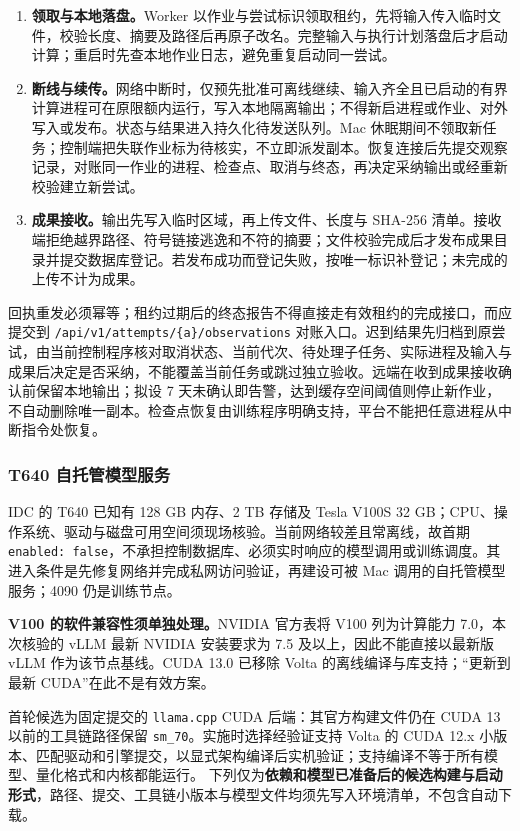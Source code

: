 \documentclass[11pt,a4paper]{article}
\begin{document}
\begin{enumerate}[leftmargin=2em,itemsep=3pt]
  \item \textbf{领取与本地落盘。}Worker 以作业与尝试标识领取租约，先将输入传入临时文件，校验长度、摘要及路径后再原子改名。完整输入与执行计划落盘后才启动计算；重启时先查本地作业日志，避免重复启动同一尝试。
  \item \textbf{断线与续传。}网络中断时，仅预先批准可离线继续、输入齐全且已启动的有界计算进程可在原限额内运行，写入本地隔离输出；不得新启进程或作业、对外写入或发布。状态与结果进入持久化待发送队列。Mac 休眠期间不领取新任务；控制端把失联作业标为待核实，不立即派发副本。恢复连接后先提交观察记录，对账同一作业的进程、检查点、取消与终态，再决定采纳输出或经重新校验建立新尝试。
  \item \textbf{成果接收。}输出先写入临时区域，再上传文件、长度与 SHA-256 清单。接收端拒绝越界路径、符号链接逃逸和不符的摘要；文件校验完成后才发布成果目录并提交数据库登记。若发布成功而登记失败，按唯一标识补登记；未完成的上传不计为成果。
\end{enumerate}

回执重发必须幂等；租约过期后的终态报告不得直接走有效租约的完成接口，而应提交到 \texttt{/api/v1/attempts/\{a\}/observations} 对账入口。迟到结果先归档到原尝试，由当前控制程序核对取消状态、当前代次、待处理子任务、实际进程及输入与成果后决定是否采纳，不能覆盖当前任务或跳过独立验收。远端在收到成果接收确认前保留本地输出；拟设 7 天未确认即告警，达到缓存空间阈值则停止新作业，不自动删除唯一副本。检查点恢复由训练程序明确支持，平台不能把任意进程从中断指令处恢复。

\subsubsection{T640 自托管模型服务}

IDC 的 T640 已知有 128 GB 内存、2 TB 存储及 Tesla V100S 32 GB；CPU、操作系统、驱动与磁盘可用空间须现场核验。当前网络较差且常离线，故首期 \texttt{enabled: false}，不承担控制数据库、必须实时响应的模型调用或训练调度。其进入条件是先修复网络并完成私网访问验证，再建设可被 Mac 调用的自托管模型服务；4090 仍是训练节点。

\textbf{V100 的软件兼容性须单独处理。}NVIDIA 官方表将 V100 列为计算能力 7.0，本次核验的 vLLM 最新 NVIDIA 安装要求为 7.5 及以上，因此不能直接以最新版 vLLM 作为该节点基线。CUDA 13.0 已移除 Volta 的离线编译与库支持；“更新到最新 CUDA”在此不是有效方案。\cite{ops-nvidia-legacy,ops-vllm-gpu,ops-cuda13}

首轮候选为固定提交的 \texttt{llama.cpp} CUDA 后端：其官方构建文件仍在 CUDA 13 以前的工具链路径保留 \texttt{sm\_70}。实施时选择经验证支持 Volta 的 CUDA 12.x 小版本、匹配驱动和引擎提交，以显式架构编译后实机验证；支持编译不等于所有模型、量化格式和内核都能运行。\cite{ops-llama-cmake,ops-llama-build} 下列仅为\textbf{依赖和模型已准备后的候选构建与启动形式}，路径、提交、工具链小版本与模型文件均须先写入环境清单，不包含自动下载。
\end{document}
